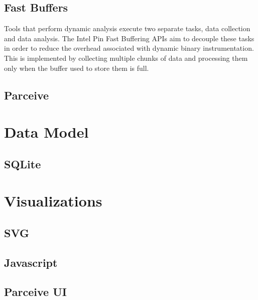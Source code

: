 \subsection{Fast Buffers}

Tools that perform dynamic analysis execute two separate tasks, data collection and data analysis. The Intel Pin Fast Buffering APIs \cite{pinbuffer} aim to decouple these tasks in order to reduce the overhead associated with dynamic binary instrumentation. This is implemented by collecting multiple chunks of data and processing them only when the buffer used to store them is full.



\subsection{Parceive}
\section {Data Model}
\subsection{SQLite}
\section {Visualizations}
\subsection {SVG}
\subsection {Javascript}
\subsection {Parceive UI}